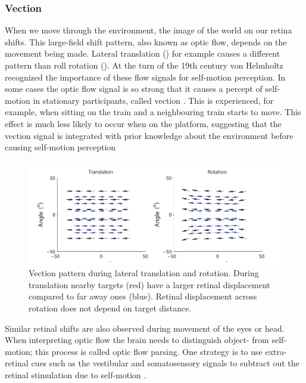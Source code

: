 \subsubsection{Vection}
When we move through the environment, the image of the world on our retina shifts. This large-field shift pattern, also known as optic flow, depends on the movement being made. Lateral translation () for example causes a different pattern than roll rotation (). At the turn of the 19th century von Helmholtz \citeyear{vonhelmholtz1867} recognized the importance of these flow signals for self-motion perception. In some cases the optic flow signal is so strong that it causes a percept of self-motion in stationary participants, called vection \cite{dichgans1978}. This is experienced, for example, when sitting on the train and a neighbouring train starts to move. This effect is much less likely to occur when on the platform, suggesting that the vection signal is integrated with prior knowledge about the environment before causing self-motion perception \cite{andersen1985,lepecq1995}


\begin{figure}
    \includegraphics[width=1.0\textwidth]{src/intro/figures/optic_flow.pdf}

    \caption{Vection pattern during  lateral translation and  rotation. During translation nearby targets (red) have a larger retinal displacement compared to far away ones (blue). Retinal displacement across rotation does not depend on target distance. }
    \label{intro:fig:vection}
\end{figure}

Similar retinal shifts are also observed during movement of the eyes or head. When interpreting optic flow the brain needs to distinguish object- from self-motion; this process is called optic flow parsing. One strategy is to use extra-retinal cues such as the vestibular and somatosensory signals to subtract out the retinal stimulation due to self-motion \cite{wertheim1994,wexler2001,macneilage2012}.

